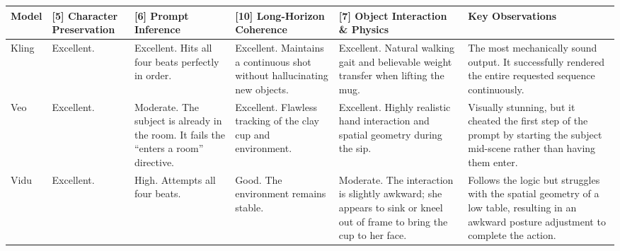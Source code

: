 \documentclass[sigconf]{acmart}
\begin{document}
\begin{table}[H]
    \centering
    \renewcommand{\arraystretch}{1.3}
    \begin{tabularx}{\textwidth}{| l | >{\raggedright\arraybackslash}X | >{\raggedright\arraybackslash}X | >{\raggedright\arraybackslash}X | >{\raggedright\arraybackslash}X | >{\raggedright\arraybackslash}X |}
        \hline
        \textbf{Model} & \textbf{[5] Character Preservation} & \textbf{[6] Prompt Inference}                                                           & \textbf{[10] Long-Horizon Coherence}                                                                                          & \textbf{[7] Object Interaction \& Physics}                                                                             & \textbf{Key Observations}                                                                                                                    \\ \hline
        Kling          & Excellent.                          & Excellent. Hits all four beats perfectly in order.                                      & Excellent. Maintains a continuous shot without hallucinating new objects.                                                     & Excellent. Natural walking gait and believable weight transfer when lifting the mug.                                   & The most mechanically sound output. It successfully rendered the entire requested sequence continuously.                                     \\ \hline
        Veo            & Excellent.                          & Moderate. The subject is already in the room. It fails the ``enters a room'' directive. & Excellent. Flawless tracking of the clay cup and environment.                                                                 & Excellent. Highly realistic hand interaction and spatial geometry during the sip.                                      & Visually stunning, but it cheated the first step of the prompt by starting the subject mid-scene rather than having them enter.              \\ \hline
        Vidu           & Excellent.                          & High. Attempts all four beats.                                                          & Good. The environment remains stable.                                                                                         & Moderate. The interaction is slightly awkward; she appears to sink or kneel out of frame to bring the cup to her face. & Follows the logic but struggles with the spatial geometry of a low table, resulting in an awkward posture adjustment to complete the action. \\ \hline

\end{tabularx}
\end{table}
\end{document}
